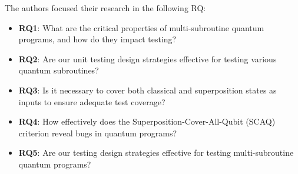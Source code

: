 \begin{itemize}
The authors focused their research in the following RQ:
\begin{itemize}
    \item[] \textbf{RQ1}: What are the critical properties of multi-subroutine quantum programs, and how do they impact testing?
    \item[] \textbf{RQ2}: Are our unit testing design strategies effective for testing various quantum subroutines?
    \item[] \textbf{RQ3}: Is it necessary to cover both classical and superposition states as inputs to ensure adequate test coverage?
    \item[] \textbf{RQ4}: How effectively does the Superposition-Cover-All-Qubit (SCAQ) criterion reveal bugs in quantum programs?
    \item[] \textbf{RQ5}: Are our testing design strategies effective for testing multi-subroutine quantum programs?
\end{itemize}


\end{itemize}
